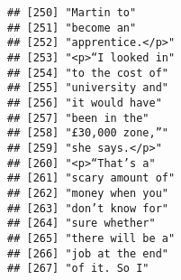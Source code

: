 \documentclass[]{article}
\begin{document}
\begin{verbatim}
## [250] "Martin to"                                                                                                                                
## [251] "become an"                                                                                                                                
## [252] "apprentice.</p>"                                                                                                                          
## [253] "<p>“I looked in"                                                                                                                          
## [254] "to the cost of"                                                                                                                           
## [255] "university and"                                                                                                                           
## [256] "it would have"                                                                                                                            
## [257] "been in the"                                                                                                                              
## [258] "£30,000 zone,”"                                                                                                                           
## [259] "she says.</p>"                                                                                                                            
## [260] "<p>“That’s a"                                                                                                                             
## [261] "scary amount of"                                                                                                                          
## [262] "money when you"                                                                                                                           
## [263] "don’t know for"                                                                                                                           
## [264] "sure whether"                                                                                                                             
## [265] "there will be a"                                                                                                                          
## [266] "job at the end"                                                                                                                           
## [267] "of it. So I"                                                                                                                              

\end{verbatim}
\end{document}
